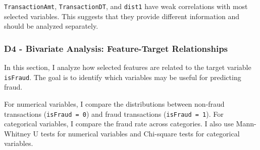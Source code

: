 \documentclass[11pt]{article}
\begin{document}
\texttt{TransactionAmt}, \texttt{TransactionDT}, and \texttt{dist1} have
weak correlations with most selected variables. This suggests that they
provide different information and should be analyzed separately.

    \subsubsection{D4 - Bivariate Analysis: Feature-Target
Relationships}\label{d4---bivariate-analysis-feature-target-relationships}

    In this section, I analyze how selected features are related to the
target variable \texttt{isFraud}. The goal is to identify which
variables may be useful for predicting fraud.

For numerical variables, I compare the distributions between non-fraud
transactions (\texttt{isFraud\ =\ 0}) and fraud transactions
(\texttt{isFraud\ =\ 1}). For categorical variables, I compare the fraud
rate across categories. I also use Mann-Whitney U tests for numerical
variables and Chi-square tests for categorical variables.
\end{document}
